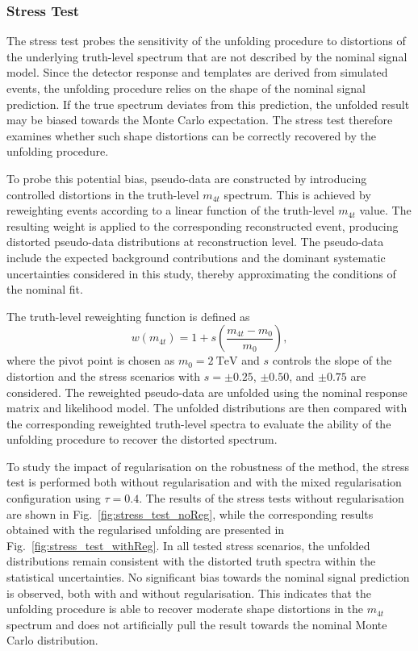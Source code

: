 \subsubsection*{\textbf{Stress Test}}

The stress test probes the sensitivity of the unfolding procedure to distortions of the underlying truth-level spectrum that are not described by the nominal signal model. 
Since the detector response and templates are derived from simulated events, the unfolding procedure relies on the shape of the nominal signal prediction. 
If the true spectrum deviates from this prediction, the unfolded result may be biased towards the Monte Carlo expectation. 
The stress test therefore examines whether such shape distortions can be correctly recovered by the unfolding procedure.

To probe this potential bias, pseudo-data are constructed by introducing controlled distortions in the truth-level $m_{4t}$ spectrum. 
This is achieved by reweighting events according to a linear function of the truth-level $m_{4t}$ value. 
The resulting weight is applied to the corresponding reconstructed event, producing distorted pseudo-data distributions at reconstruction level. 
The pseudo-data include the expected background contributions and the dominant systematic uncertainties considered in this study, thereby approximating the conditions of the nominal fit.

The truth-level reweighting function is defined as
\begin{equation}
w(m_{4t}) = 1 + s \left(\frac{m_{4t}-m_0}{m_0}\right),
\end{equation}
where the pivot point is chosen as $m_0 = 2~\mathrm{TeV}$ and $s$ controls the slope of the distortion and the stress scenarios with $s=\pm0.25$, $\pm0.50$, and $\pm0.75$ are considered.
The reweighted pseudo-data are unfolded using the nominal response matrix and likelihood model. 
The unfolded distributions are then compared with the corresponding reweighted truth-level spectra to evaluate the ability of the unfolding procedure to recover the distorted spectrum. 

To study the impact of regularisation on the robustness of the method, the stress test is performed both without regularisation and with the mixed regularisation configuration using $\tau=0.4$. 
The results of the stress tests without regularisation are shown in Fig.~\ref{fig:stress_test_noReg}, while the corresponding results obtained with the regularised unfolding are presented in Fig.~\ref{fig:stress_test_withReg}. 
In all tested stress scenarios, the unfolded distributions remain consistent with the distorted truth spectra within the statistical uncertainties. 
No significant bias towards the nominal signal prediction is observed, both with and without regularisation. 
This indicates that the unfolding procedure is able to recover moderate shape distortions in the $m_{4t}$ spectrum and does not artificially pull the result towards the nominal Monte Carlo distribution.

